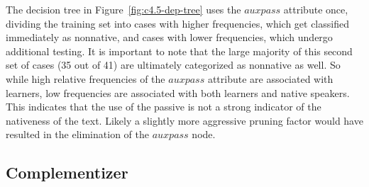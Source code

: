 \documentclass[main.tex]{subfiles}
\begin{document}

The decision tree in Figure~\ref{fig:c4.5-dep-tree} uses the $auxpass$ attribute once, dividing the training set into cases with higher frequencies, which get classified immediately as nonnative, and cases with lower frequencies, which undergo additional testing. It is important to note that the large majority of this second set of cases (35 out of 41) are ultimately categorized as nonnative as well. So while high relative frequencies of the $auxpass$ attribute are associated with learners, low frequencies are associated with both learners and native speakers. This indicates that the use of the passive is not a strong indicator of the nativeness of the text. Likely a slightly more aggressive pruning factor would have resulted in the elimination of the $auxpass$ node.

\subsection{Complementizer}
\end{document}
